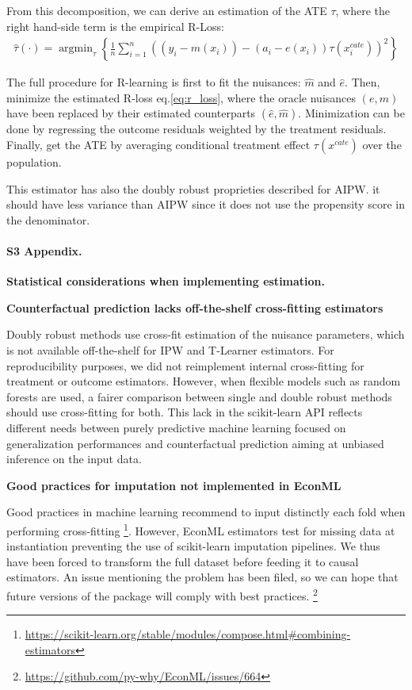 \documentclass[10pt,letterpaper]{article}
\begin{document}
From this decomposition, we can derive an estimation of the ATE $\tau$, where
the right hand-side term is the empirical R-Loss:
\begin{align}\label{eq:r_loss}
  \hat{\tau}(\cdot)=\operatorname{argmin}_{\tau}\left\{\frac{1}{n} \sum_{i=1}^{n}\left(\left(y_{i}-m\left(x_{i}\right)\right)-\left(a_{i}-e(x_{i})\right) \tau\left(x^{cate}_{i}\right)\right)^{2}\right\}
\end{align}

The full procedure for R-learning is first to fit the nuisances: $\hat m$ and
$\hat e$. Then, minimize the estimated R-loss eq.\ref{eq:r_loss}, where
the oracle nuisances $(e, m)$ have been replaced by their estimated
counterparts $(\hat e, \hat m)$. Minimization can be done by regressing
the outcome residuals weighted by the treatment residuals. Finally, get
the ATE by averaging conditional treatment effect $\tau(x^{cate})$ over
the population.

This estimator has also the doubly robust proprieties described for AIPW. it
should have less variance than AIPW since it does not use the propensity score
in the denominator.
\clearpage


\paragraph*{S3 Appendix.}
\label{apd:statistical_considerations}
{\bf Statistical considerations when implementing
  estimation.}

\textbf{Counterfactual prediction lacks off-the-shelf cross-fitting estimators}

Doubly robust methods use cross-fit estimation of the nuisance parameters,
which is not available off-the-shelf for IPW and T-Learner estimators. For
reproducibility purposes, we did not reimplement internal cross-fitting for
treatment or outcome estimators. However, when flexible models such as
random forests are used, a fairer comparison between single and double
robust methods should use cross-fitting for both. This lack in the
scikit-learn API \cite{pedregosa2011scikit} reflects different needs
between purely predictive machine learning focused on generalization
performances and counterfactual prediction aiming at unbiased inference on
the input data.

\textbf{Good practices for imputation not implemented in EconML}

Good practices in machine learning recommend to input distinctly each fold
when performing cross-fitting
\footnote{\url{https://scikit-learn.org/stable/modules/compose.html\#combining-estimators}}.
However, EconML estimators test for missing data at instantiation
preventing the use of scikit-learn imputation pipelines. We thus have been
forced to transform the full dataset before feeding it to causal estimators.
An issue mentioning the problem has been filed, so we can hope that future
versions of the package will comply with best practices. \footnote{\url{https://github.com/py-why/EconML/issues/664}}
\end{document}
